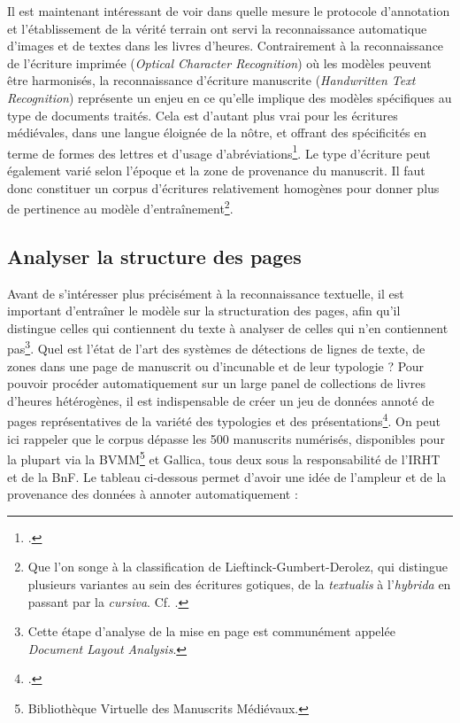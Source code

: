 \documentclass[a4paper,12pt,twoside]{book}
\begin{document}
Il est maintenant intéressant de voir dans quelle mesure le protocole d'annotation et l'établissement de la vérité terrain ont servi la reconnaissance automatique d'images et de textes dans les livres d'heures. Contrairement à la reconnaissance de l'écriture imprimée (\textit{Optical Character Recognition}) où les modèles peuvent être harmonisés, la reconnaissance d'écriture manuscrite (\textit{Handwritten Text Recognition}) représente un enjeu en ce qu'elle implique des modèles spécifiques au type de documents traités. Cela est d'autant plus vrai pour les écritures médiévales, dans une langue éloignée de la nôtre, et offrant des spécificités en terme de formes des lettres et d'usage d'abréviations\footcite[p. 21]{Seg_Livres_Heures}. Le type d'écriture peut également varié selon l'époque et la zone de provenance du manuscrit. Il faut donc constituer un corpus d'écritures relativement homogènes pour donner plus de pertinence au modèle d'entraînement\footnote{Que l'on songe à la classification de Lieftinck-Gumbert-Derolez, qui distingue plusieurs variantes au sein des écritures gotiques, de la \textit{textualis} à l'\textit{hybrida} en passant par la \textit{cursiva}. Cf. \cite{classification_ecriture_gothique}.}.


	\subsection{Analyser la structure des pages}
	
	Avant de s'intéresser plus précisément à la reconnaissance textuelle, il est important d'entraîner le modèle sur la structuration des pages, afin qu'il distingue celles qui contiennent du texte à analyser de celles qui n'en contiennent pas\footnote{Cette étape d'analyse de la mise en page est communément appelée \textit{Document Layout Analysis}.}. Quel est l'état de l'art des systèmes de détections de lignes de texte, de zones dans une page de manuscrit ou d'incunable et de leur typologie ? Pour pouvoir procéder automatiquement sur un large panel de collections de livres d'heures hétérogènes, il est indispensable de créer un jeu de données annoté de pages représentatives de la variété des typologies et des présentations\footcite[p. 7]{annotated_dataset_book_hours}. On peut ici rappeler que le corpus dépasse les 500 manuscrits numérisés, disponibles pour la plupart via la BVMM\footnote{Bibliothèque Virtuelle des Manuscrits Médiévaux.} et Gallica, tous deux sous la responsabilité de l'IRHT et de la BnF. Le tableau ci-dessous permet d'avoir une idée de l'ampleur et de la provenance des données à annoter automatiquement : 
\end{document}
